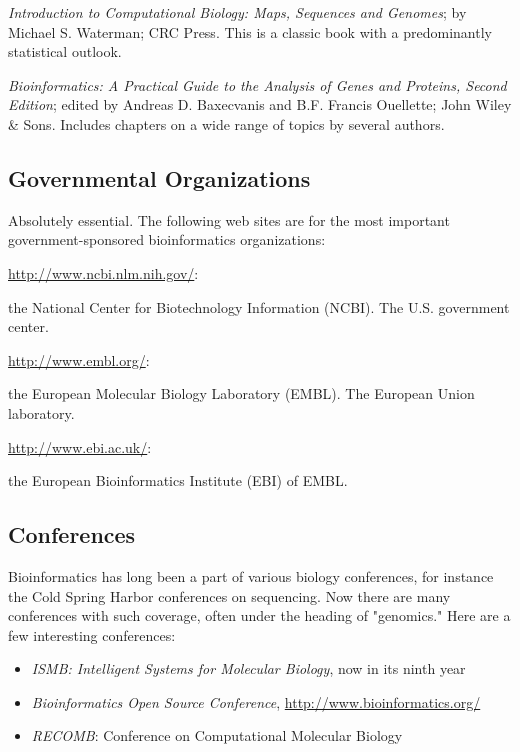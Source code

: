 \textit{Introduction to Computational Biology: Maps, Sequences and Genomes}; by Michael S. Waterman; CRC Press. This is a classic book with a predominantly statistical outlook.

\textit{Bioinformatics: A Practical Guide to the Analysis of Genes and Proteins, Second Edition}; edited by Andreas D. Baxecvanis and B.F. Francis Ouellette; John Wiley \& Sons. Includes chapters on a wide range of topics by several authors.

\subsection{Governmental Organizations}
Absolutely essential. The following web sites are for the most important government-sponsored bioinformatics organizations:

\href{http://www.ncbi.nlm.nih.gov/}{http://www.ncbi.nlm.nih.gov/}:

\begin{adjustwidth}{2em}{}
the National Center for Biotechnology Information (NCBI). The U.S. government center.
\end{adjustwidth}

\href{http://www.embl.org/}{http://www.embl.org/}:

\begin{adjustwidth}{2em}{}
the European Molecular Biology Laboratory (EMBL). The European Union laboratory.
\end{adjustwidth}

\href{http://www.ebi.ac.uk/}{http://www.ebi.ac.uk/}:

\begin{adjustwidth}{2em}{}
the European Bioinformatics Institute (EBI) of EMBL.
\end{adjustwidth}

\subsection{Conferences}
Bioinformatics has long been a part of various biology conferences, for instance the Cold Spring Harbor conferences on sequencing. Now there are many conferences with such coverage, often under the heading of "genomics." Here are a few interesting conferences:

\begin{itemize}
  \item \textit{ISMB: Intelligent Systems for Molecular Biology}, now in its ninth year
  \item \textit{Bioinformatics Open Source Conference}, \href{http://www.bioinformatics.org/}{http://www.bioinformatics.org/}
  \item \textit{RECOMB}: Conference on Computational Molecular Biology
\end{itemize}

